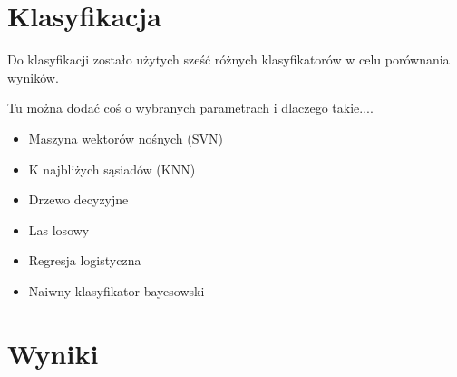\documentclass[12pt]{article}
\begin{document}
\section{Klasyfikacja}
	Do klasyfikacji zostało użytych sześć różnych klasyfikatorów w celu porównania wyników.

Tu można dodać coś o wybranych parametrach i dlaczego takie....

\begin{itemize}
\item{Maszyna wektorów nośnych (SVN)}
\item{K najbliżych sąsiadów (KNN)}
\item{Drzewo decyzyjne}
\item{Las losowy}
\item{Regresja logistyczna}
\item{Naiwny klasyfikator bayesowski}

\end{itemize}

\section{Wyniki}
\end{document}
